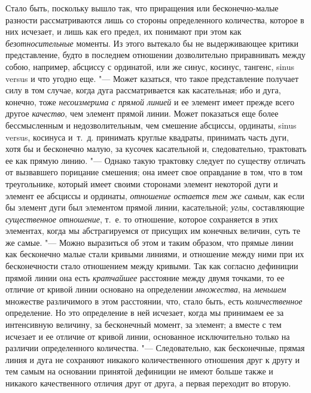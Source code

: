 Стало быть, поскольку вышло так, что приращения или бесконечно-малые разности
рассматриваются лишь со стороны определенного количества, которое в них
исчезает, и лишь как его предел, их понимают при этом как
{\em безотносительные} моменты. Из этого вытекало бы не выдерживающее критики
представление, будто в последнем отношении дозволительно приравнивать между
собою, например, абсциссу с ординатой, или же синус, косинус, тангенс, sinus
versus и что угодно еще. "--- Может казаться, что такое представление получает
силу в том случае, когда дуга рассматривается как касательная; ибо и дуга,
конечно, тоже {\em несоизмерима с прямой линией} и ее элемент имеет прежде
всего другое {\em качество}, чем элемент прямой линии. Может показаться еще
более бессмысленным и недозволительным, чем смешение абсциссы, ординаты, sinus
versus, косинуса и~т.~д. принимать круглые квадраты, принимать часть дуги, хотя
бы и бесконечно малую, за кусочек касательной и, следовательно, трактовать ее
как прямую линию. "--- Однако такую трактовку следует по существу отличать от
вызвавшего порицание смешения; она имеет свое оправдание в том, что в том
треугольнике, который имеет своими сторонами элемент некоторой дуги и элемент
ее абсциссы и ординаты, {\em отношение остается тем же самым}, как если бы
элемент дуги был элементом прямой линии, касательной; {\em углы}, составляющие
{\em существенное отношение}, т.~е. то отношение, которое сохраняется в этих
элементах, когда мы абстрагируемся от присущих им конечных величин, суть те же
самые. "--- Можно выразиться об этом и таким образом, что прямые линии как
бесконечно малые стали кривыми линиями, и отношение между ними при их
бесконечности стало отношением между кривыми. Так как согласно дефиниции прямой
линии она есть {\em кратчайшее} расстояние между двумя точками, то ее отличие
от кривой линии основано на определении {\em множества}, на {\em меньшем}
множестве различимого в этом расстоянии, что, стало быть, есть
{\em количественное} определение. Но это определение в ней исчезает, когда мы
принимаем ее за интенсивную величину, за бесконечный момент, за элемент; а
вместе с тем исчезает и ее отличие от кривой линии, основанное исключительно
только на различии определенного количества. "--- Следовательно, как
бесконечные, прямая линия и дуга не сохраняют никакого количественного
отношения друг к другу и тем самым на основании принятой дефиниции не имеют
больше также и никакого качественного отличия друг от друга, а первая переходит
во вторую.

